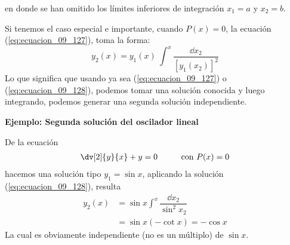 en donde se han omitido los límites inferiores de integración $x_{1} = a$ y $x_{2}=b$. 
\par
Si tenemos el caso especial e importante, cuando $P(x) = 0$, la ecuación (\ref{eq:ecuacion_09_127}), toma la forma:
\begin{equation}
y_{2}(x) =  y_{1}(x) \: \int^{x} \dfrac{\dd{x_{2}}}{[y_{1}(x_{2})]^{2}}
\label{eq:ecuacion_09_128}
\end{equation}
Lo que significa que usando ya sea (\ref{eq:ecuacion_09_127}) o (\ref{eq:ecuacion_09_128}), podemos tomar una solución conocida y luego integrando, podemos generar una segunda solución independiente.
\par
\textbf{Ejemplo: Segunda solución del oscilador lineal}

De la ecuación
\begin{align*}
\dv[2]{y}{x} + y = 0 \hspace{1cm} \mbox{con } P(x) = 0
\end{align*}
hacemos una solución tipo $y_{1} = \sin x$, aplicando la solución (\ref{eq:ecuacion_09_128}), resulta
\begin{align*}
y_{2}(x) &= \sin x \int^{x} \dfrac{\dd{x_{2}}}{\sin^{2} x_{2}} \\
&= \sin x (-\cot x) = - \cos x
\end{align*}
La cual es obviamente independiente (no es un múltiplo) de $\sin x$.
